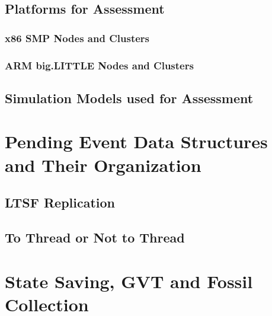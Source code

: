 \documentclass[11pt]{book}
\newcommand{\showPlots}[3]{
  \begin{figure}
    \begin{minipage}{.5\textwidth}
      \begin{center}
        \texttt{[image: figs/traffic/\#1]} \\
        Traffic Model \\
      \end{center}
    \end{minipage} \hfill \begin{minipage}{.5\textwidth}
      \begin{center}
        \texttt{[image: figs/pcs/\#1]} \\
        PCS Model \\
      \end{center}
    \end{minipage}
    \caption{#3}\label{#2}
  \end{figure}
}
\begin{document}


\section{Platforms for Assessment}

\subsection{x86 SMP Nodes and Clusters}


\subsection{ARM big.LITTLE Nodes and Clusters}

\section{Simulation Models used for Assessment}


\chapter{Pending Event Data Structures and Their Organization}\label{pending_event_set}

\section{LTSF Replication}


\section{To Thread or Not to Thread}


\chapter{State Saving, GVT and Fossil Collection}\label{gvt_fossilcollection}
\end{document}
